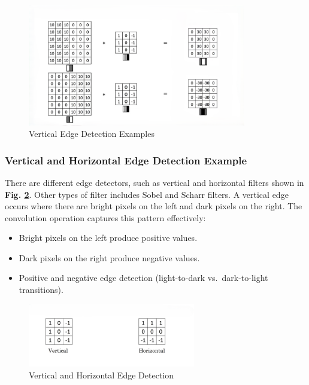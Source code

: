 \documentclass[letterpaper,12pt,notitlepage,twoside]{report}
\begin{document}
\begin{figure}[h]
	\centering
	\includegraphics[width=0.85\textwidth]{Images/Vertical Edge Detection Examples.png}
	\caption{Vertical Edge Detection Examples}
	\label{fig:21}
\end{figure}
\FloatBarrier

\subsubsection*{Vertical and Horizontal Edge Detection Example}
There are different edge detectors, such as vertical and horizontal filters shown in \textbf{Fig. \ref{fig:22}}. Other types of filter includes Sobel and Scharr filters. A vertical edge occurs where there are bright pixels on the left and dark pixels on the right. The convolution operation captures this pattern effectively:
    \begin{itemize}[nosep]
        \item Bright pixels on the left produce positive values.
        \item Dark pixels on the right produce negative values.
        \item Positive and negative edge detection (light-to-dark vs.~dark-to-light transitions).
    \end{itemize}

\begin{figure}[h]
	\centering
	\includegraphics[width=0.65\textwidth]{Images/Vertical and Horizontal Edge Detection.png}
	\caption{Vertical and Horizontal Edge Detection}
	\label{fig:22}
\end{figure}
\FloatBarrier
\end{document}
